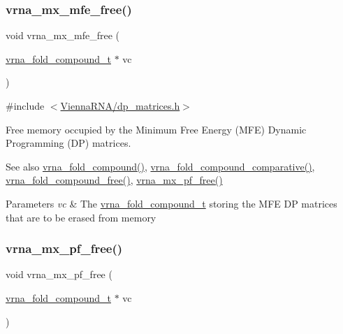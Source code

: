 \subsubsection{\texorpdfstring{vrna\+\_\+mx\+\_\+mfe\+\_\+free()}{vrna\_mx\_mfe\_free()}}
{\footnotesize\ttfamily void vrna\+\_\+mx\+\_\+mfe\+\_\+free (\begin{DoxyParamCaption}\item[{\mbox{\hyperlink{group__fold__compound_ga1b0cef17fd40466cef5968eaeeff6166}{vrna\+\_\+fold\+\_\+compound\+\_\+t}} $\ast$}]{vc }\end{DoxyParamCaption})}



{\ttfamily \#include $<$\mbox{\hyperlink{dp__matrices_8h}{Vienna\+R\+N\+A/dp\+\_\+matrices.\+h}}$>$}



Free memory occupied by the Minimum Free Energy (M\+FE) Dynamic Programming (DP) matrices. 

\begin{DoxySeeAlso}{See also}
\mbox{\hyperlink{group__fold__compound_ga6601d994ba32b11511b36f68b08403be}{vrna\+\_\+fold\+\_\+compound()}}, \mbox{\hyperlink{group__fold__compound_gad6bacc816af274922b13d947f708aa0c}{vrna\+\_\+fold\+\_\+compound\+\_\+comparative()}}, \mbox{\hyperlink{group__fold__compound_gadded6039d63f5d6509836e20321534ad}{vrna\+\_\+fold\+\_\+compound\+\_\+free()}}, \mbox{\hyperlink{group__dp__matrices_ga2283e69fd139fb8e58d7ade3b5773f9c}{vrna\+\_\+mx\+\_\+pf\+\_\+free()}}
\end{DoxySeeAlso}

\begin{DoxyParams}{Parameters}
{\em vc} & The \mbox{\hyperlink{group__fold__compound_ga1b0cef17fd40466cef5968eaeeff6166}{vrna\+\_\+fold\+\_\+compound\+\_\+t}} storing the M\+FE DP matrices that are to be erased from memory \\
\hline
\end{DoxyParams}
\mbox{\label{group__dp__matrices_ga2283e69fd139fb8e58d7ade3b5773f9c}} 
\subsubsection{\texorpdfstring{vrna\+\_\+mx\+\_\+pf\+\_\+free()}{vrna\_mx\_pf\_free()}}
{\footnotesize\ttfamily void vrna\+\_\+mx\+\_\+pf\+\_\+free (\begin{DoxyParamCaption}\item[{\mbox{\hyperlink{group__fold__compound_ga1b0cef17fd40466cef5968eaeeff6166}{vrna\+\_\+fold\+\_\+compound\+\_\+t}} $\ast$}]{vc }\end{DoxyParamCaption})}



